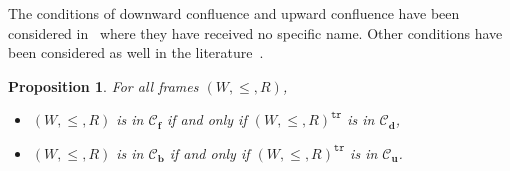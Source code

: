 \documentclass[draft]{article}
\newtheorem{proposition}{Proposition}
\def\bcfra{\mathbf{b}}
\def\fcfra{\mathbf{f}}
\def\dcfra{\mathbf{d}}
\def\ucfra{\mathbf{u}}
\begin{document}
The conditions of downward confluence and upward confluence have been considered in~\cite{Bozic:Dosen:1984} where they have received no specific name.
Other conditions have been considered as well in the literature~\cite{Sotirov:1984}.
%
%
%
%
%
%
\begin{proposition}\label{Proposition:about:fc:bc:dc:uc:preorder:first}
%
%
For all frames $(W,{\leq},{R})$,
%
%
\begin{itemize}
%
%
\item $(W,{\leq},{R})$ is in ${\mathcal C}_{\fcfra}$ if and only if $(W,{\leq},{R})^{\mathtt{tr}}$ is in ${\mathcal C}_{\dcfra}$,
%
%
\item $(W,{\leq},{R})$ is in ${\mathcal C}_{\bcfra}$ if and only if $(W,{\leq},{R})^{\mathtt{tr}}$ is in ${\mathcal C}_{\ucfra}$.
%
%
\end{itemize}
%
%
\end{proposition}
%
%
%
%
%
%
%
%
%
%
%
%
%
%
%
%
%
%
%
%
%
%
%
%
%
%
%
%
%
%
%
%
%
%
%
%
%
%
%
%
%
%
%
%
%
%
%
%
%
%
%
%
%
%
\end{document}
